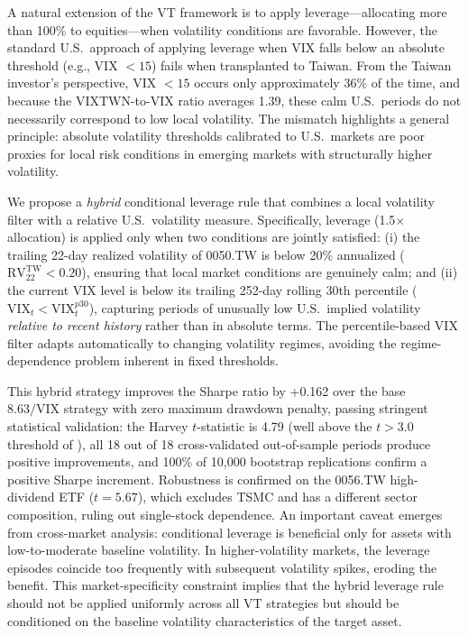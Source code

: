 A natural extension of the VT framework is to apply leverage---allocating more than 100\% to equities---when volatility conditions are favorable. However, the standard U.S.\ approach of applying leverage when VIX falls below an absolute threshold (e.g., VIX $< 15$) fails when transplanted to Taiwan. From the Taiwan investor's perspective, VIX $< 15$ occurs only approximately 36\% of the time, and because the VIXTWN-to-VIX ratio averages 1.39, these calm U.S.\ periods do not necessarily correspond to low local volatility. The mismatch highlights a general principle: absolute volatility thresholds calibrated to U.S.\ markets are poor proxies for local risk conditions in emerging markets with structurally higher volatility.

We propose a \textit{hybrid} conditional leverage rule that combines a local volatility filter with a relative U.S.\ volatility measure. Specifically, leverage (1.5$\times$ allocation) is applied only when two conditions are jointly satisfied: (i) the trailing 22-day realized volatility of 0050.TW is below 20\% annualized ($\text{RV}_{22}^{\text{TW}} < 0.20$), ensuring that local market conditions are genuinely calm; and (ii) the current VIX level is below its trailing 252-day rolling 30th percentile ($\text{VIX}_t < \text{VIX}_{t}^{p30}$), capturing periods of unusually low U.S.\ implied volatility \textit{relative to recent history} rather than in absolute terms. The percentile-based VIX filter adapts automatically to changing volatility regimes, avoiding the regime-dependence problem inherent in fixed thresholds.

This hybrid strategy improves the Sharpe ratio by +0.162 over the base $8.63/\text{VIX}$ strategy with zero maximum drawdown penalty, passing stringent statistical validation: the Harvey $t$-statistic is 4.79 (well above the $t > 3.0$ threshold of \citealt{harvey2016}), all 18 out of 18 cross-validated out-of-sample periods produce positive improvements, and 100\% of 10,000 bootstrap replications confirm a positive Sharpe increment. Robustness is confirmed on the 0056.TW high-dividend ETF ($t = 5.67$), which excludes TSMC and has a different sector composition, ruling out single-stock dependence. An important caveat emerges from cross-market analysis: conditional leverage is beneficial only for assets with low-to-moderate baseline volatility. In higher-volatility markets, the leverage episodes coincide too frequently with subsequent volatility spikes, eroding the benefit. This market-specificity constraint implies that the hybrid leverage rule should not be applied uniformly across all VT strategies but should be conditioned on the baseline volatility characteristics of the target asset.


